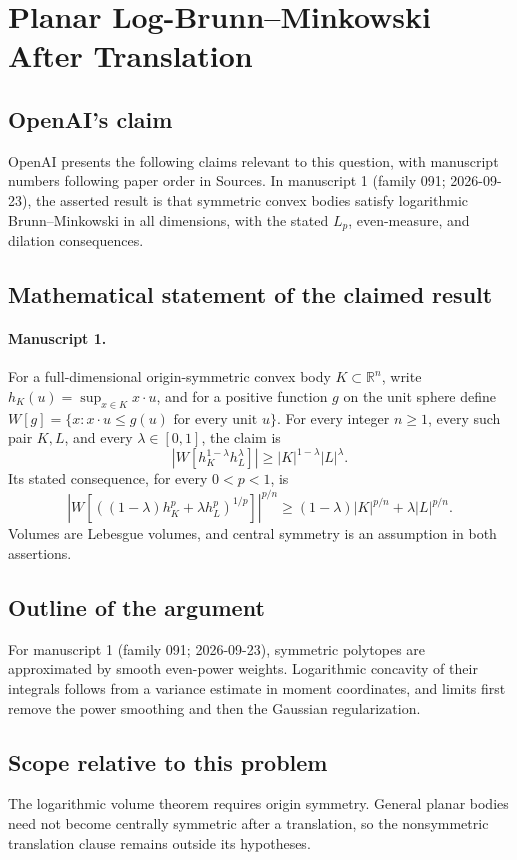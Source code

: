 \documentclass[11pt]{article}
\begin{document}
\section*{Planar Log-Brunn–Minkowski After Translation}

\subsection{OpenAI's claim}
OpenAI presents the following claims relevant to this question, with manuscript numbers following paper order in Sources. In manuscript 1 (family 091; 2026-09-23), the asserted result is that symmetric convex bodies satisfy logarithmic Brunn--Minkowski in all dimensions, with the stated $L_p$, even-measure, and dilation consequences.

\subsection{Mathematical statement of the claimed result}
\paragraph{Manuscript 1.}
For a full-dimensional origin-symmetric convex body $K\subset\mathbb R^n$, write $h_K(u)=\sup_{x\in K}x\cdot u$, and for a positive function $g$ on the unit sphere define $W[g]=\{x:x\cdot u\le g(u)\text{ for every unit }u\}$. For every integer $n\ge1$, every such pair $K,L$, and every $\lambda\in[0,1]$, the claim is
\[
 |W[h_K^{1-\lambda}h_L^{\lambda}]|\ge |K|^{1-\lambda}|L|^{\lambda}.
\]
Its stated consequence, for every $0<p<1$, is
\[
 \left|W[((1-\lambda)h_K^p+\lambda h_L^p)^{1/p}]\right|^{p/n}
 \ge(1-\lambda)|K|^{p/n}+\lambda|L|^{p/n}.
\]
Volumes are Lebesgue volumes, and central symmetry is an assumption in both assertions.

\subsection{Outline of the argument}
For manuscript 1 (family 091; 2026-09-23), symmetric polytopes are approximated by smooth even-power weights. Logarithmic concavity of their integrals follows from a variance estimate in moment coordinates, and limits first remove the power smoothing and then the Gaussian regularization.

\subsection{Scope relative to this problem}
The logarithmic volume theorem requires origin symmetry. General planar bodies need not become centrally symmetric after a translation, so the nonsymmetric translation clause remains outside its hypotheses.
\end{document}
